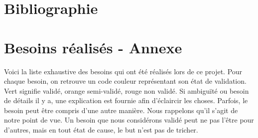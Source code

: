 \documentclass{article}
\begin{document}
\section{Bibliographie}
 
 


\section{Besoins réalisés - Annexe}
\label{Spec}

Voici la liste exhaustive des besoins qui ont été réalisés lors de ce projet. Pour chaque besoin, on retrouve un code couleur représentant
son état de validation. Vert signifie validé, orange semi-validé, rouge non validé. Si ambiguïté ou besoin de détails il y a, une explication
est fournie afin d'éclaircir les choses. Parfois, le besoin peut être compris d'une autre manière. Nous rappelons qu'il s'agit de notre point de vue.
Un besoin que nous considérons validé peut ne pas l'être pour d'autres, mais en tout état de cause, le but n'est pas de tricher.
\end{document}
